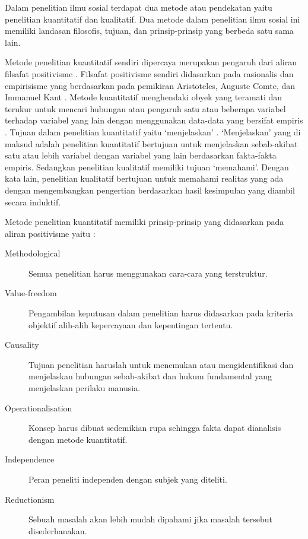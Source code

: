 	\question
\lipsum[2]
\begin{solution}
	Dalam penelitian ilmu sosial terdapat dua metode atau pendekatan yaitu penelitian kuantitatif dan kualitatif.
	Dua metode dalam penelitian ilmu sosial ini memiliki landasan filosofis, tujuan, dan prinsip-prinsip yang berbeda satu sama lain.
	
	Metode penelitian kuantitatif sendiri dipercaya merupakan pengaruh dari aliran filsafat positivisme \cite{ginting_filsafat_2008,mertens_research_2015,kothari_research_2013}.
	Filsafat positivisme sendiri didasarkan pada rasionalis dan empirisisme yang berdasarkan pada pemikiran Aristoteles, Auguste Comte, dan Immanuel Kant \cite{mertens_research_2015}.
	Metode kuantitatif menghendaki obyek yang teramati dan terukur untuk mencari hubungan atau pengaruh satu atau beberapa variabel terhadap variabel yang lain dengan menggunakan data-data yang bersifat empiris \cite{ginting_filsafat_2008}.
	Tujuan dalam penelitian kuantitatif yaitu `menjelaskan' \cite{ginting_filsafat_2008}.
	`Menjelaskan' yang di maksud adalah penelitian kuantitatif bertujuan untuk menjelaskan sebab-akibat satu atau lebih variabel dengan variabel yang lain berdasarkan fakta-fakta empiris. Sedangkan penelitian kualitatif memiliki tujuan `memahami'. Dengan kata lain, penelitian kualitatif bertujuan untuk memahami realitas yang ada dengan mengembangkan pengertian berdasarkan hasil kesimpulan yang diambil secara induktif.
	
	Metode penelitian kuantitatif memiliki prinsip-prinsip yang didasarkan pada aliran positivisme yaitu \cite{crossan_research_2003}:
	\begin{description}
		\item[Methodological] Semua penelitian harus menggunakan cara-cara yang terstruktur.
		\item[Value-freedom] Pengambilan keputusan dalam penelitian harus didasarkan pada kriteria objektif alih-alih kepercayaan dan kepentingan tertentu.
		\item[Causality] Tujuan penelitian haruslah untuk menemukan atau mengidentifikasi dan menjelaskan hubungan sebab-akibat dan hukum fundamental yang menjelaskan perilaku manusia.
		\item[Operationalisation] Konsep harus dibuat sedemikian rupa sehingga fakta dapat dianalisis dengan metode kuantitatif.
		\item[Independence] Peran peneliti independen dengan subjek yang diteliti.
		\item[Reductionism] Sebuah masalah akan lebih mudah dipahami jika masalah tersebut disederhanakan.
	\end{description}
	

\end{solution}
